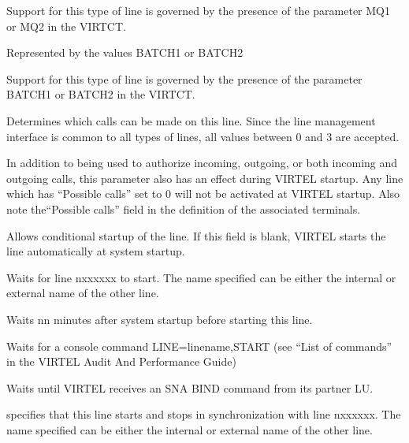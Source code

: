 \documentclass[letterpaper,10pt,english]{sphinxmanual}
\begin{document}
\begin{description}
\begin{description}
\sphinxAtStartPar
Support for this type of line is governed by the presence of the
parameter MQ1 or MQ2 in the VIRTCT.

\sphinxAtStartPar
Represented by the values BATCH1 or BATCH2

\sphinxAtStartPar
Support for this type of line is governed by the presence of the
parameter BATCH1 or BATCH2 in the VIRTCT.

\end{description}

\sphinxAtStartPar
Determines which calls can be made on this line. Since the line
management interface is common to all types of lines, all values
between 0 and 3 are accepted.

\sphinxAtStartPar
In addition to being used to authorize incoming, outgoing, or both
incoming and outgoing calls, this parameter also has an effect
during VIRTEL startup. Any line which has “Possible calls” set to 0
will not be activated at VIRTEL startup. Also note the“Possible
calls” field in the definition of the associated terminals.

\sphinxAtStartPar
Allows conditional startup of the line. If this field is blank,
VIRTEL starts the line automatically at system startup.
\begin{description}
\sphinxAtStartPar
Waits for line n\sphinxhyphen{}xxxxxx to start. The name specified can be either
the internal or external name of the other line.

\sphinxAtStartPar
Waits nn minutes after system startup before starting this line.

\sphinxAtStartPar
Waits for a console command LINE=linename,START (see “List of
commands” in the VIRTEL Audit And Performance Guide)

\sphinxAtStartPar
Waits until VIRTEL receives an SNA BIND command from its partner LU.

\sphinxAtStartPar
specifies that this line starts and stops in synchronization with
line n\sphinxhyphen{}xxxxxx. The name specified can be either the internal or
external name of the other line.

\end{description}


\end{description}
\end{document}

